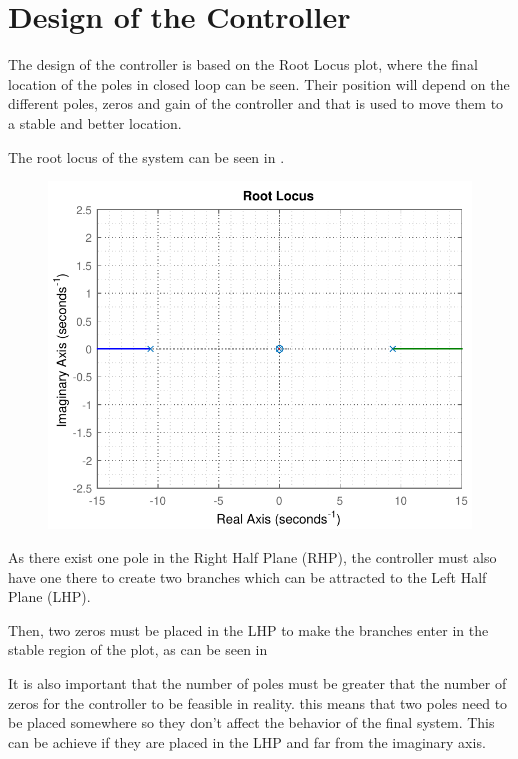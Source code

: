 \section{Design of the Controller}\label{designController}
The design of the controller is based on the Root Locus plot, where the final location of the poles in closed loop can be seen. Their position will depend on the different poles, zeros and gain of the controller and that is used to move them to a stable and better location.

The root locus of the system can be seen in .

\begin{figure}[H]
	\centering 
	\includegraphics[scale=.56]{figures/rlocusCubli}
 	\label{rlocusCubli2}
\end{figure}

As there exist one pole in the Right Half Plane (RHP), the controller must also have one there to create two branches which can be attracted to the Left Half Plane (LHP).


Then, two zeros must be placed in the LHP to make the branches enter in the stable region of the plot, as can be seen in 


It is also important that the number of poles must be greater that the number of zeros for the controller to be feasible in reality. this means that two poles need to be placed somewhere so they don't affect the behavior of the final system. This can be achieve if they are placed in the LHP and far from the imaginary axis.

